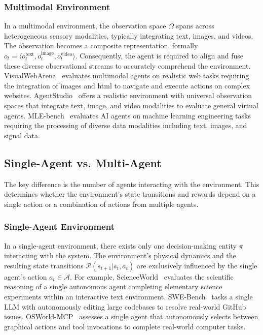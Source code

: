 \documentclass{llmxive}
\begin{document}
\subsubsection{Multimodal Environment}
In a multimodal environment, the observation space $\Omega$ spans across heterogeneous sensory modalities, typically integrating text, images, and videos. The observation becomes a composite representation, formally $o_t = \langle o_t^{\text{text}}, o_t^{\text{image}}, o_t^{\text{video}} \rangle$. Consequently, the agent is required to align and fuse these diverse observational streams to accurately comprehend the environment. VisualWebArena~\cite{VisualWebArena} evaluates multimodal agents on realistic web tasks requiring the integration of images and html to navigate and execute actions on complex websites. AgentStudio~\cite{AgentStudio} offers a realistic environment with universal observation spaces that integrate text, image, and video modalities to evaluate general virtual agents. MLE-bench~\cite{MLE-bench} evaluates AI agents on machine learning engineering tasks requiring the processing of diverse data modalities including text, images, and signal data. 

\subsection{Single-Agent vs. Multi-Agent}
\label{attribute:Single-Agent vs. Multi-Agent}
The key difference is the number of agents interacting with the environment. This determines whether the environment's state transitions and rewards depend on a single action or a combination of actions from multiple agents.
\subsubsection{Single-Agent Environment}
In a single-agent environment, there exists only one decision-making entity $\pi$ interacting with the system. The environment's physical dynamics and the resulting state transitions $\mathcal{P}(s_{t+1} | s_t, a_t)$ are exclusively influenced by the single agent's action $a_t \in \mathcal{A}$. For example, ScienceWorld~\cite{ScienceWorld} evaluates the scientific reasoning of a single autonomous agent completing elementary science experiments within an interactive text environment. SWE-Bench~\cite{SWE-Bench} tasks a single LLM with autonomously editing large codebases to resolve real-world GitHub issues. OSWorld-MCP~\cite{OSWorld-MCP} assesses a single agent that autonomously selects between graphical actions and tool invocations to complete real-world computer tasks.
\end{document}
